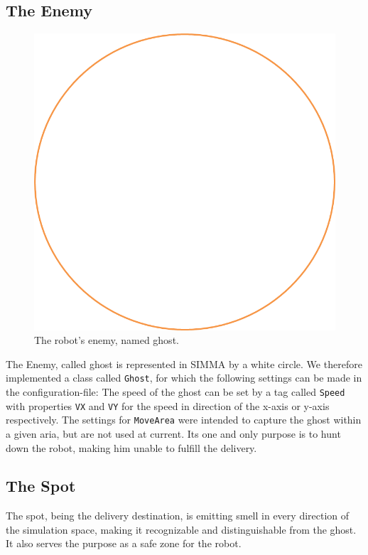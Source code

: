 \documentclass[12pt,fleqn,a4paper]{article}
\begin{document}
\subsection{The Enemy}
\begin{figure}[h]
\centering
\includegraphics[scale=0.3]{img/ghost.png}
\caption{The robot's enemy, named ghost.}
\label{fig:ghost}
\end{figure}

The Enemy, called ghost is represented in SIMMA by a white circle. We therefore implemented a class called \texttt{Ghost}, for which the following settings can be made in the configuration-file: The speed of the ghost can be set by a tag called \texttt{Speed} with properties \texttt{VX} and \texttt{VY} for the speed in direction of the x-axis or y-axis respectively. The settings for \texttt{MoveArea} were intended to capture the ghost within a given aria, but are not used at current. Its one and only purpose is to hunt down the robot, making him unable to fulfill the delivery.

\subsection{The Spot}
The spot, being the delivery destination, is emitting smell in every direction of the simulation space, making it recognizable and distinguishable from the ghost. It also serves the purpose as a safe zone for the robot.
\end{document}
